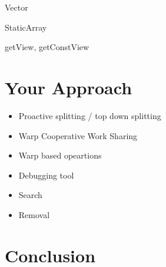 \documentclass{article}
\begin{document}
Vector

StaticArray

getView, getConstView

\section{Your Approach}

\begin{itemize}
    \item Proactive splitting / top down splitting
    \item Warp Cooperative Work Sharing
    \item Warp based opeartions
    \item Debugging tool
    \item Search
    \item Removal
\end{itemize}

\section{Conclusion}


\printbibliography
\end{document}
